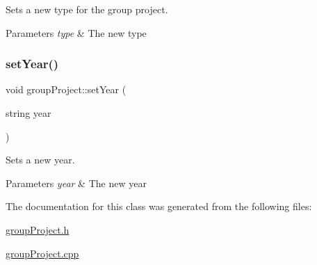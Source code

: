 Sets a new type for the group project. 


\begin{DoxyParams}{Parameters}
{\em type} & The new type \\
\hline
\end{DoxyParams}
\mbox{\label{classgroup_project_af145f11631fb84d566abff2349979fcf}} 
\subsubsection{\texorpdfstring{set\+Year()}{setYear()}}
{\footnotesize\ttfamily void group\+Project\+::set\+Year (\begin{DoxyParamCaption}\item[{string}]{year }\end{DoxyParamCaption})}



Sets a new year. 


\begin{DoxyParams}{Parameters}
{\em year} & The new year \\
\hline
\end{DoxyParams}


The documentation for this class was generated from the following files\+:\begin{DoxyCompactItemize}
\item 
\hyperlink{group_project_8h}{group\+Project.\+h}\item 
\hyperlink{group_project_8cpp}{group\+Project.\+cpp}\end{DoxyCompactItemize}

